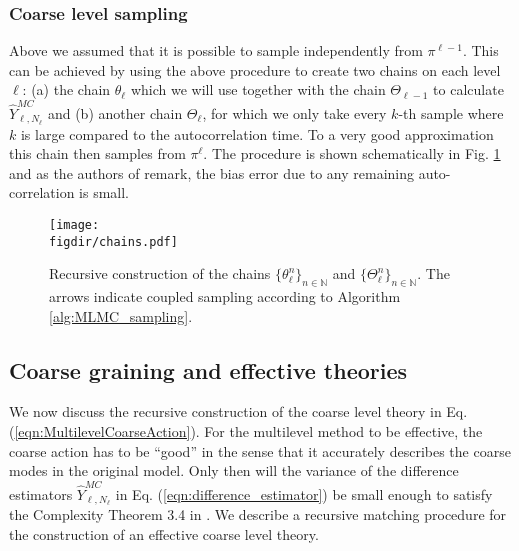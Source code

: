 \documentclass[11pt]{article}
\newcommand{\figdir}{./figures/}
\begin{document}
\subsubsection{Coarse level sampling}
Above we assumed that it is possible to sample independently from $\pi^{\ell-1}$. This can be achieved by using the above procedure to create two chains on each level $\ell$: (a) the chain $\theta_\ell$ which we will use together with the chain $\Theta_{\ell-1}$ to calculate $\hat{Y}_{\ell,N_\ell}^{MC}$ and (b) another chain $\Theta_{\ell}$, for which we only take every $k$-th sample where $k$ is large compared to the autocorrelation time. To a very good approximation this chain then samples from $\pi^\ell$. The procedure is shown schematically in Fig. \ref{fig:chains} and as the authors of \cite{Dodwell2015} remark, the bias error due to any remaining auto-correlation is small.
\begin{figure}
  \begin{center}
    \texttt{[image: \\figdir/chains.pdf]}
    \caption{Recursive construction of the chains $\{\theta_\ell^n\}_{n\in\mathbb{N}}$ and $\{\Theta_\ell^n\}_{n\in\mathbb{N}}$. The arrows indicate coupled sampling according to Algorithm \ref{alg:MLMC_sampling}.}
    \label{fig:chains}
  \end{center}
\end{figure}
\subsection{Coarse graining and effective theories}\label{sec:coarse_graining}
We now discuss the recursive construction of the coarse level theory in Eq. (\ref{eqn:MultilevelCoarseAction}). For the multilevel method to be effective, the coarse action has to be ``good'' in the sense that it accurately describes the coarse modes in the original model. Only then will the variance of the difference estimators $\hat{Y}^{MC}_{\ell,N_\ell}$ in Eq. (\ref{eqn:difference_estimator}) be small enough to satisfy the Complexity Theorem 3.4 in \cite{Dodwell2015}. We describe a recursive matching procedure for the construction of an effective coarse level theory.
\end{document}
